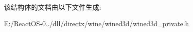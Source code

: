 该结构体的文档由以下文件生成\+:\begin{DoxyCompactItemize}
\item 
E\+:/\+React\+O\+S-\/0../dll/directx/wine/wined3d/wined3d\+\_\+private.\+h\end{DoxyCompactItemize}

